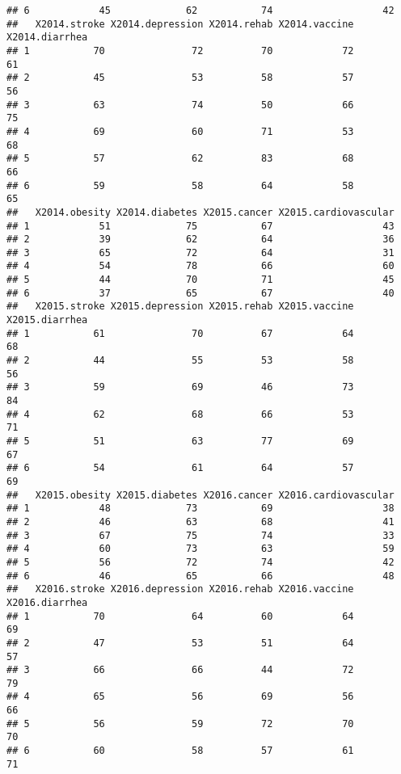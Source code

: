 \documentclass[]{article}
\begin{document}
\begin{verbatim}
## 6            45             62           74                   42
##   X2014.stroke X2014.depression X2014.rehab X2014.vaccine X2014.diarrhea
## 1           70               72          70            72             61
## 2           45               53          58            57             56
## 3           63               74          50            66             75
## 4           69               60          71            53             68
## 5           57               62          83            68             66
## 6           59               58          64            58             65
##   X2014.obesity X2014.diabetes X2015.cancer X2015.cardiovascular
## 1            51             75           67                   43
## 2            39             62           64                   36
## 3            65             72           64                   31
## 4            54             78           66                   60
## 5            44             70           71                   45
## 6            37             65           67                   40
##   X2015.stroke X2015.depression X2015.rehab X2015.vaccine X2015.diarrhea
## 1           61               70          67            64             68
## 2           44               55          53            58             56
## 3           59               69          46            73             84
## 4           62               68          66            53             71
## 5           51               63          77            69             67
## 6           54               61          64            57             69
##   X2015.obesity X2015.diabetes X2016.cancer X2016.cardiovascular
## 1            48             73           69                   38
## 2            46             63           68                   41
## 3            67             75           74                   33
## 4            60             73           63                   59
## 5            56             72           74                   42
## 6            46             65           66                   48
##   X2016.stroke X2016.depression X2016.rehab X2016.vaccine X2016.diarrhea
## 1           70               64          60            64             69
## 2           47               53          51            64             57
## 3           66               66          44            72             79
## 4           65               56          69            56             66
## 5           56               59          72            70             70
## 6           60               58          57            61             71

\end{verbatim}
\end{document}
